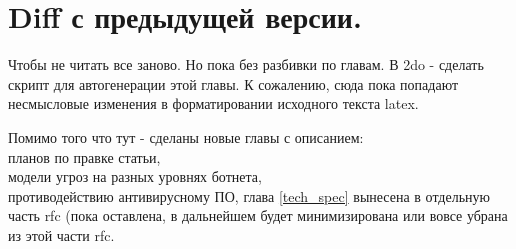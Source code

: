 \section{Diff с предыдущей версии.}
\label{diff_from_prev_ver}
Чтобы не читать все заново. Но пока без разбивки по главам. В 2do -
сделать скрипт для автогенерации этой главы. К сожалению, сюда пока
попадают несмысловые изменения в форматировании исходного текста latex.

Помимо того что тут - сделаны новые главы с описанием:\\
 планов по правке статьи,\\
 модели угроз на разных уровнях ботнета,\\
 противодействию антивирусному ПО,
 глава \ref{tech_spec} вынесена в отдельную часть rfc (пока оставлена, в дальнейшем
будет минимизирована или вовсе убрана из этой части rfc.

